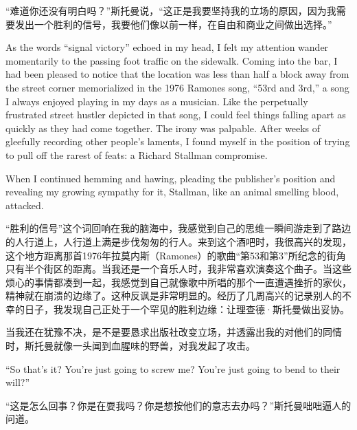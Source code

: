 \ifdefined\chs
``难道你还没有明白吗？''斯托曼说，``这正是我要坚持我的立场的原因，因为我需要发出一个胜利的信号，我要他们像以前一样，在自由和商业之间做出选择。''
\fi

\ifdefined\eng
As the words ``signal victory'' echoed in my head, I felt my attention wander momentarily to the passing foot traffic on the sidewalk. Coming into the bar, I had been pleased to notice that the location was less than half a block away from the street corner memorialized in the 1976 Ramones song, ``53rd and 3rd,'' a song I always enjoyed playing in my days as a musician. Like the perpetually frustrated street hustler depicted in that song, I could feel things falling apart as quickly as they had come together. The irony was palpable. After weeks of gleefully recording other people's laments, I found myself in the position of trying to pull off the rarest of feats: a Richard Stallman compromise. 

When I continued hemming and hawing, pleading the publisher's position and revealing my growing sympathy for it, Stallman, like an animal smelling blood, attacked. 
\fi

\ifdefined\chs
``胜利的信号''这个词回响在我的脑海中，我感觉到自己的思维一瞬间游走到了路边的人行道上，人行道上满是步伐匆匆的行人。来到这个酒吧时，我很高兴的发现，这个地方距离那首1976年拉莫内斯（Ramones）的歌曲``第53和第3''所纪念的街角只有半个街区的距离。当我还是一个音乐人时，我非常喜欢演奏这个曲子。当这些烦心的事情都凑到一起，我感觉到自己就像歌中所唱的那个一直遭遇挫折的家伙，精神就在崩溃的边缘了。这种反讽是非常明显的。经历了几周高兴的记录别人的不幸的日子，我发现自己正处于一个罕见的胜利边缘：让理查德·斯托曼做出妥协。

当我还在犹豫不决，是不是要恳求出版社改变立场，并透露出我的对他们的同情时，斯托曼就像一头闻到血腥味的野兽，对我发起了攻击。
\fi

\ifdefined\eng
``So that's it? You're just going to screw me? You're just going to bend to their will?''
\fi

\ifdefined\chs
``这是怎么回事？你是在耍我吗？你是想按他们的意志去办吗？''斯托曼咄咄逼人的问道。
\fi


